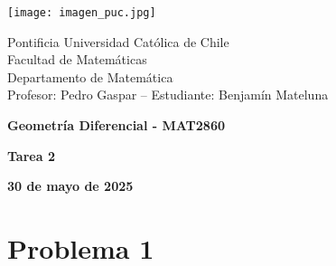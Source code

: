 \documentclass{article}
\begin{document}
\begin{minipage}{2.5cm}
    \texttt{[image: imagen\_puc.jpg]}
\end{minipage}
\begin{minipage}{14cm}
    {\sc Pontificia Universidad Católica de Chile\\
    Facultad de Matemáticas\\
    Departamento de Matemática\\
    Profesor: Pedro Gaspar -- Estudiante: Benjamín Mateluna}
\end{minipage}
\vspace{1ex}

{\centerline{\bf Geometría Diferencial - MAT2860}
\centerline{\bf Tarea 2}}
\centerline{\bf 30 de mayo de 2025}

\section*{Problema 1}
\end{document}
